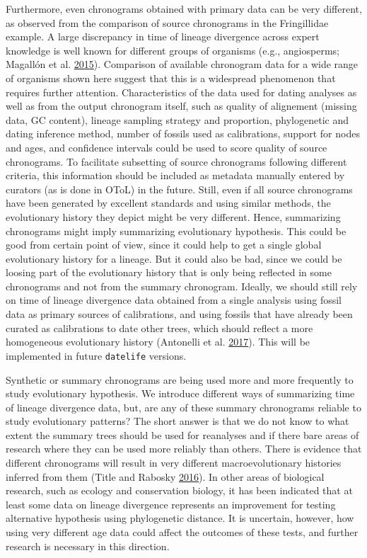 \documentclass[]{article}
\begin{document}
Furthermore, even chronograms obtained with primary data can be very different, as observed from the comparison of source chronograms in the Fringillidae example.
A large discrepancy in time of lineage divergence across expert knowledge is well known for different groups of organisms (e.g., angiosperms; Magallón et al. \protect\hyperlink{ref-magallon2015metacalibrated}{2015}). Comparison of available chronogram data for a wide range of organisms shown here suggest that this is a widespread phenomenon that requires further attention.
Characteristics of the data used for dating analyses as well as from the output chronogram itself, such as quality of alignement (missing data, GC content), lineage sampling strategy and proportion, phylogenetic and dating inference method, number of fossils used as calibrations, support for nodes and ages, and confidence intervals could be used to score quality of source chronograms. To facilitate subsetting of source chronograms following different criteria, this information should be included as metadata manually entered by curators (as is done in OToL) in the future.
Still, even if all source chronograms have been generated by excellent standards and using similar methods, the evolutionary history they depict might be very different. Hence, summarizing chronograms might imply summarizing evolutionary hypothesis. This could be good from certain point of view, since it could help to get a single global evolutionary history for a lineage. But it could also be bad, since we could be loosing part of the evolutionary history that is only being reflected in some chronograms and not from the summary chronogram.
Ideally, we should still rely on time of lineage divergence data obtained from a single analysis using fossil data as primary sources of calibrations, and using fossils that have already been curated as calibrations to date other trees, which should reflect a more homogeneous evolutionary history (Antonelli et al. \protect\hyperlink{ref-antonelli2017supersmart}{2017}). This will be implemented in future \texttt{datelife} versions.

Synthetic or summary chronograms are being used more and more frequently to study evolutionary hypothesis. We introduce different ways of summarizing time of lineage divergence data, but, are any of these summary chronograms reliable to study evolutionary patterns? The short answer is that we do not know to what extent the summary trees should be used for reanalyses and if there bare areas of research where they can be used more reliably than others. There is evidence that different chronograms will result in very different macroevolutionary histories inferred from them (Title and Rabosky \protect\hyperlink{ref-title2016macrophylogenies}{2016}). In other areas of biological research, such as ecology and conservation biology, it has been indicated that at least some data on lineage divergence represents an improvement for testing alternative hypothesis using phylogenetic distance. It is uncertain, however, how using very different age data could affect the outcomes of these tests, and further research is necessary in this direction.
\end{document}
